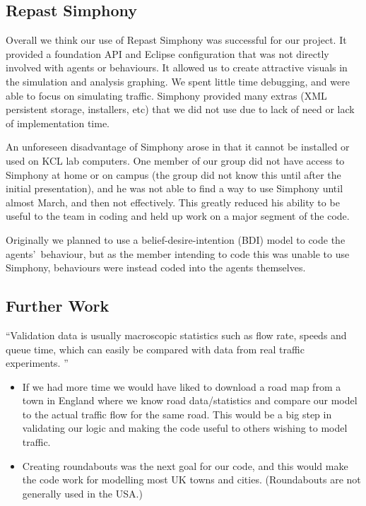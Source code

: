 \documentclass[11pt]{article}
\begin{document}
\begin{enumerate}
\subsection{Repast Simphony}

Overall we think our use of Repast Simphony was successful for our project. It provided a foundation API and Eclipse configuration that was not directly involved with agents or behaviours. It allowed us to create attractive visuals in the simulation and analysis graphing. We spent little time debugging, and were able to focus on simulating traffic. Simphony provided many extras (XML persistent storage, installers, etc) that we did not use due to lack of need or lack of implementation time.

An unforeseen disadvantage of Simphony arose in that it cannot be installed or used on KCL lab computers. One member of our group did not have access to Simphony at home or on campus (the group did not know this until after the initial presentation), and he was not able to find a way to use Simphony until almost March, and then not effectively. This greatly reduced his ability to be useful to the team in coding and held up work on a major segment of the code.

Originally we planned to use a belief-desire-intention (BDI) model to code the agents\textquoteright\ behaviour, but as the member intending to code this was unable to use Simphony, behaviours were instead coded into the agents themselves.
\\


\subsection{Further Work}

\textquotedblleft Validation data is usually macroscopic statistics such as flow rate, speeds and queue time, which can easily be compared with data from real traffic experiments. \textquotedblright \cite{4d} 

\begin{itemize}\itemsep0pt
\item If we had more time we would have liked to download a road map from a town in England where we know road data/statistics and compare our model to the actual traffic flow for the same road. This would be a big step in validating our logic and making the code useful to others wishing to model traffic.

\item Creating roundabouts was the next goal for our code, and this would make the code work for modelling most UK towns and cities. (Roundabouts are not generally used in the USA.)


\end{itemize}
\end{enumerate}
\end{document}
